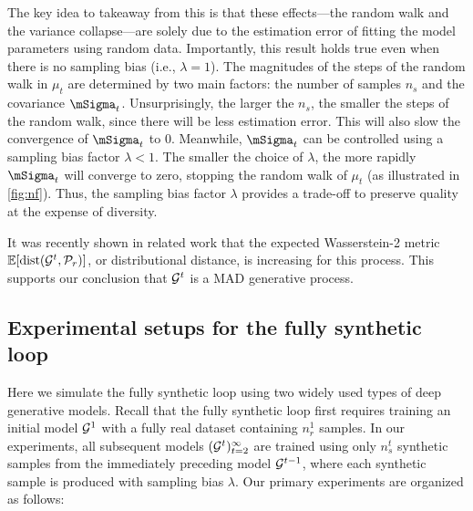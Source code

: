 \documentclass{article}
\def\bias{{\lambda}}
\def\colorSynthetic{colorA}
\def\synthetic{\textcolor{\colorSynthetic}{fully synthetic loop}}
\begin{document}
The key idea to takeaway from this is that these effects---the random walk and the variance collapse---are solely due to the estimation error of fitting the model parameters using random data. 
Importantly, this result holds true even when there is no sampling bias (i.e., $\bias =1$). 
The magnitudes of the steps of the random walk in $\mu_t$ are determined by two main factors: the number of samples $n_s$ and the covariance $\mSigma_t$. 
Unsurprisingly, the larger the $n_s$, the smaller the steps of the random walk, since there will be less estimation error. 
This will also slow the convergence of $\mSigma_t$ to $0$. 
Meanwhile, $\mSigma_t$ can be controlled using a sampling bias factor $\lambda < 1$. The smaller the choice of $\lambda$, the more rapidly $\mSigma_t$ will converge to zero, stopping the random walk of $\mu_t$ (as illustrated in \ref{fig:nf}). 
Thus, the sampling bias factor $\lambda$ provides a trade-off to  preserve quality at the expense of diversity.


It was recently shown in related work \cite{curse_of_recursion} that the expected Wasserstein-2 metric $\mathbb{E}[\mathrm{dist}(\mathcal{G}^t, \mathcal{P}_r)]$, or distributional distance, is increasing for this process.
This supports our conclusion that $\mathcal{G}^t$ is a MAD generative process.
 


\subsection{Experimental setups for the \synthetic{}}
\label{sec:synthetic_setup}

Here we simulate the \synthetic{} using two widely used types of deep generative models. Recall that the \synthetic{} first requires training an initial model $\mathcal{G}^1$ with a fully real dataset containing $n_r^1$ samples. 
In our experiments, all subsequent models $(\mathcal{G}^t)_{t=2}^\infty$ are trained using only $n_s^t$ synthetic samples from the immediately preceding model $\mathcal{G}^{t-1}$, where each synthetic sample is produced with sampling bias $\bias$. Our primary experiments are organized as follows:
\end{document}
